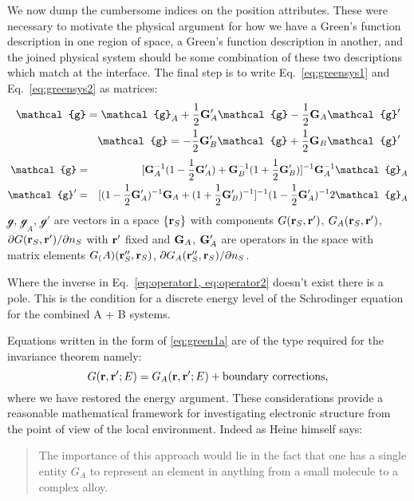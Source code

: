 \documentclass{article}
\def\G{{\bf G}}
\def\r{{\bf r}}
\def\g{\mathcal{g}}
\begin{document}
We now dump the cumbersome indices on the position attributes. These
were necessary to motivate the physical argument for how we have a Green's function
description in one region of space, a Green's function description in another, 
and the joined physical system should be some combination of these two descriptions
which match at the interface. The final step is to write Eq.~\ref{eq:greensys1} 
and Eq.~\ref{eq:greensys2} as matrices:
%
\begin{eqnarray}
\label{eq:operator1}
\g = \g_{A} + \frac{1}{2}\G'_{A}\g - \frac{1}{2}\G_{A}\g' \\
\g = -\frac{1}{2}\G'_{B}\g + \frac{1}{2}\G_{B}\g' \\
\end{eqnarray}
%
\begin{eqnarray}
\label{eq:operator2}
\g & = & [\G^{-1}_{A}(1-\frac{1}{2}\G'_{A}) + \G^{-1}_{B}(1+\frac{1}{2}\G'_{B})]^{-1} \G^{-1}_{A}\g_{A} \\
\g' & = & [(1-\frac{1}{2}\G'_{A})^{-1}\G_{A} + (1+\frac{1}{2}\G'_{B})^{-1}]^{-1}(1 - \frac{1}{2}\G'_{A})^{-1}2\g_{A}
\end{eqnarray}
%
$\g$, $\g_{A}$, $\g'$ are vectors in a space $\{\r_{S}\}$ with components $G(\r_{S},\r')$,
$G_{A}(\r_{S},\r')$, $\partial G(\r_{S},\r')/\partial n_{S}$ with $\r'$ fixed and
$\G_{A}$, $\G'_{A}$ are operators in the space with matrix elements
$G_(A)(\r''_{S}, \r_{S})$, $\partial G_{A}(\r''_{S}, \r_{S})/\partial n_{S}$.

Where the inverse in Eq.~\ref{eq:operator1, eq:operator2} 
doesn't exist there is a pole. This is the condition for a discrete energy level 
of the Schrodinger equation for the combined A + B systems. 

Equations written in the form of \ref{eq:green1a} are of the type required for the invariance theorem namely:
%
\begin{equation}
G(\r,\r';E) = G_{A}(\r,\r';E) + {\rm boundary ~ corrections},
\end{equation}
%
where we have restored the energy argument.
These considerations provide a reasonable mathematical framework for 
investigating electronic structure from the point of view of the local environment.
Indeed as Heine himself says: 

\begin{quote}
The importance of this approach would lie in the fact that
one has a single entity $G_{A}$ to represent an element in anything 
from a small molecule to a complex alloy.
\end{quote}
\end{document}
